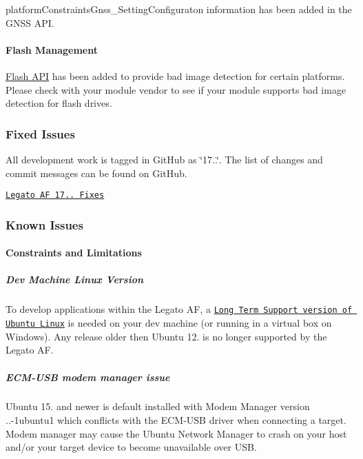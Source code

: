 platform\+Constraints\+Gnss\+\_\+\+Setting\+Configuraton information has been added in the G\+N\+SS A\+PI.\hypertarget{releaseNotes17072_rn17_07_Features_Flash}{}\paragraph{Flash Management}\label{releaseNotes17072_rn17_07_Features_Flash}
\hyperlink{c_flash}{Flash A\+PI} has been added to provide bad image detection for certain platforms. Please check with your module vendor to see if your module supports bad image detection for flash drives.\hypertarget{releaseNotes17072_rn17_07_Fixes}{}\subsubsection{Fixed Issues}\label{releaseNotes17072_rn17_07_Fixes}
All development work is tagged in Git\+Hub as \char`\"{}17..\char`\"{}. The list of changes and commit messages can be found on Git\+Hub.

\href{https://github.com/legatoproject/legato-af/commits/17.07.0}{\tt Legato AF 17.. Fixes}\hypertarget{releaseNotes17072_rn17_07_KnownIssues}{}\subsubsection{Known Issues}\label{releaseNotes17072_rn17_07_KnownIssues}
\hypertarget{releaseNotes17072_rn17_07_Constraints}{}\paragraph{Constraints and Limitations}\label{releaseNotes17072_rn17_07_Constraints}
\hypertarget{releaseNotes17072_rn17_07_ContraintsLinuxSupport}{}\subparagraph{Dev Machine Linux Version}\label{releaseNotes17072_rn17_07_ContraintsLinuxSupport}
To develop applications within the Legato AF, a \href{https://www.ubuntu.com/info/release-end-of-life}{\tt Long Term Support version of Ubuntu Linux} is needed on your dev machine (or running in a virtual box on Windows). Any release older then Ubuntu 12. is no longer supported by the Legato AF.\hypertarget{releaseNotes17072_rn17_07_ConstECMUSB}{}\subparagraph{E\+C\+M-\/\+U\+S\+B modem manager issue}\label{releaseNotes17072_rn17_07_ConstECMUSB}
Ubuntu 15. and newer is default installed with Modem Manager version {..-\/1ubuntu1} which conflicts with the E\+C\+M-\/\+U\+SB driver when connecting a target. Modem manager may cause the Ubuntu Network Manager to crash on your host and/or your target device to become unavailable over U\+SB.

